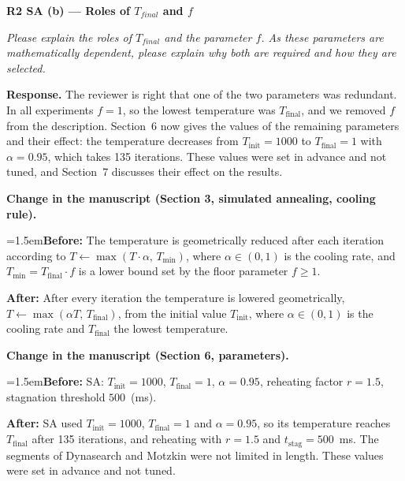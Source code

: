 \documentclass[12pt]{article}
\newenvironment{rc}[1]{\par\medskip\noindent\textbf{#1}\par\nopagebreak\noindent\itshape\renewcommand{\emph}[1]{\textbf{##1}}\ignorespaces}{\par}
\newcommand{\answer}[1]{\par\smallskip\noindent\textbf{Response.} #1\par}
\newcommand{\change}[3]{\par\smallskip\noindent\textbf{Change in the manuscript (#1).}\par
  {\leftskip=1.5em\noindent\textbf{Before:} #2\par\noindent\textbf{After:} #3\par}}
\begin{document}
\begin{rc}{R2 SA (b) --- Roles of $T_{final}$ and $f$}
Please explain the roles of $T_{final}$ and the parameter $f$. As these parameters are mathematically dependent, please explain why both are required and how they are selected.
\end{rc}
\answer{The reviewer is right that one of the two parameters was redundant. In all experiments $f=1$, so the lowest temperature was $T_{\text{final}}$, and we removed $f$ from the description. Section~6 now gives the values of the remaining parameters and their effect: the temperature decreases from $T_{\text{init}}=1000$ to $T_{\text{final}}=1$ with $\alpha=0.95$, which takes 135 iterations. These values were set in advance and not tuned, and Section~7 discusses their effect on the results.}
\change{Section 3, simulated annealing, cooling rule}{The temperature is geometrically reduced after each iteration according to $T \leftarrow \max(T \cdot \alpha,\, T_{\min})$, where $\alpha \in (0,1)$ is the cooling rate, and $T_{\min} = T_{\text{final}} \cdot f$ is a lower bound set by the floor parameter $f \ge 1$.}{After every iteration the temperature is lowered geometrically, $T\leftarrow\max(\alpha T,\,T_{\text{final}})$, from the initial value $T_{\text{init}}$, where $\alpha\in(0,1)$ is the cooling rate and $T_{\text{final}}$ the lowest temperature.}
\change{Section 6, parameters}{SA: $T_{\text{init}}=1000$, $T_{\text{final}}=1$, $\alpha=0.95$, reheating factor $r = 1.5$, stagnation threshold $500$~(ms).}{SA used $T_{\text{init}}=1000$, $T_{\text{final}}=1$ and $\alpha=0.95$, so its temperature reaches $T_{\text{final}}$ after 135 iterations, and reheating with $r=1.5$ and $t_{\text{stag}}=500$~ms. The segments of Dynasearch and Motzkin were not limited in length. These values were set in advance and not tuned.}
\end{document}
